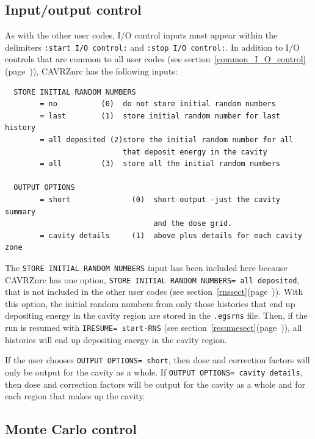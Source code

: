 \documentclass[12pt,twoside]{article}  %
\newcommand{\lpage}[1]{(page~\pageref{#1})}
\begin{document}
\subsection{Input/output control}
\label{cavrziosect}

As with the other user codes, I/O control inputs must appear within
the delimiters {\tt :start I/O control:} and {\tt :stop I/O control:}.
In addition to I/O controls that are common to all user codes (see
section~\ref{common_I_O_control}\lpage{common_I_O_control}), CAVRZnrc
has the following inputs:
\begin{verbatim}
  STORE INITIAL RANDOM NUMBERS
        = no          (0)  do not store initial random numbers
        = last        (1)  store initial random number for last history
        = all deposited (2)store the initial random number for all
                           that deposit energy in the cavity
        = all         (3)  store all the initial random numbers

  OUTPUT OPTIONS
        = short              (0)  short output -just the cavity summary
                                  and the dose grid.
        = cavity details     (1)  above plus details for each cavity zone
\end{verbatim}
The {\tt STORE INITIAL RANDOM NUMBERS} input has been included here because
CAVRZnrc has one option, {\tt STORE INITIAL RANDOM NUMBERS= all deposited},
that is not included in the other user codes (see
section~\ref{rnssect}\lpage{rnssect}).
With this option, the initial random numbers from only those histories that
end up depositing energy in the cavity region are stored in the
{\tt .egsrns} file.  Then, if the run is resumed with
{\tt IRESUME= start-RNS} (see section~\ref{resumesect}\lpage{resumesect}),
all histories will end up depositing energy in the cavity region.

If the user chooses {\tt OUTPUT OPTIONS= short}, then dose and correction
factors will only be output for the cavity as a whole.  If
{\tt OUTPUT OPTIONS= cavity details}, then dose and correction factors
will be output for the cavity as a whole and for each region that makes up
the cavity.

\subsection{Monte Carlo control}
\end{document}
